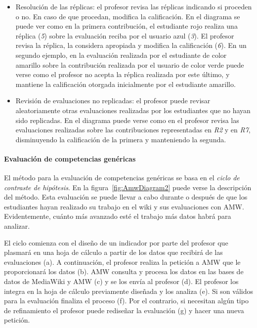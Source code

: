 \begin{itemize}
\item Resolución de las réplicas: el profesor revisa las réplicas indicando si proceden o no. En caso de que procedan, modifica la calificación. En el diagrama se puede ver como en la primera contribución, el estudiante rojo realiza una réplica (\emph{5}) sobre la evaluación reciba por el usuario azul (\emph{3}). El profesor revisa la réplica, la considera apropiada y modifica la calificación (\emph{6}). En un segundo ejemplo, en la evaluación realizada por el estudiante de color amarillo sobre la contribución realizada por el usuario de color verde puede verse como el profesor no acepta la réplica realizada por este último, y mantiene la calificación otorgada inicialmente por el estudiante amarillo.
\item Revisión de evaluaciones no replicadas: el profesor puede revisar aleatoriamente otras evaluaciones realizadas por los estudiantes que no hayan sido replicadas. En el diagrama puede verse como en el profesor revisa las evaluaciones realizadas sobre las contribuciones representadas en \emph{R2} y en \emph{R7}, disminuyendo la calificación de la primera y manteniendo la segunda.
\end{itemize}

\paragraph{Evaluación de competencias genéricas}

El método para la evaluación de competencias genéricas se basa en el \emph{ciclo de contraste de hipótesis}. En la figura~\ref{fig:AmwDiagram2} puede verse la descripción del método. Esta evaluación se puede llevar a cabo durante o después de que los estudiantes hayan realizado su trabajo en el wiki y sus evaluaciones con AMW. Evidentemente, cuánto más avanzado esté el trabajo más datos habrá para analizar. 

El ciclo comienza con el diseño de un indicador por parte del profesor que plasmará en una hoja de cálculo a partir de los datos que recibirá de las evaluaciones (a). A continuación, el profesor realiza la petición a AMW que le proporcionará los datos (b). AMW consulta y procesa los datos en las bases de datos de MediaWiki y AMW (c) y se los envía al profesor (d). El profesor los integra en la hoja de cálculo previamente diseñada y los analiza (e). Si son válidos para la evaluación finaliza el proceso (f). Por el contrario, si necesitan algún tipo de refinamiento el profesor puede rediseñar la evaluación (g) y hacer una nueva petición.


